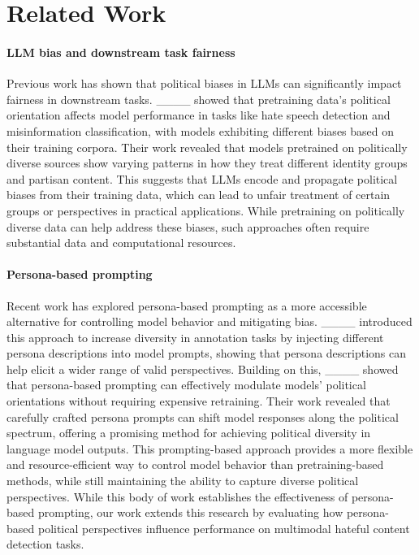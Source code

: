 \section{Related Work}
\paragraph{\textbf{LLM bias and downstream task fairness}}
Previous work has shown that political biases in LLMs can significantly impact fairness in downstream tasks. ____ showed that pretraining data's political orientation affects model performance in tasks like hate speech detection and misinformation classification, with models exhibiting different biases based on their training corpora. Their work revealed that models pretrained on politically diverse sources show varying patterns in how they treat different identity groups and partisan content. This suggests that LLMs encode and propagate political biases from their training data, which can lead to unfair treatment of certain groups or perspectives in practical applications. 
While pretraining on politically diverse data can help address these biases, such approaches often require substantial data and computational resources.


\paragraph{\textbf{Persona-based prompting}}
Recent work has explored persona-based prompting as a more accessible alternative for controlling model behavior and mitigating bias. ____ introduced this approach to increase diversity in annotation tasks by injecting different persona descriptions into model prompts, showing that persona descriptions can help elicit a wider range of valid perspectives. Building on this, ____ showed that persona-based prompting can effectively modulate models' political orientations without requiring expensive retraining. Their work revealed that carefully crafted persona prompts can shift model responses along the political spectrum, offering a promising method for achieving political diversity in language model outputs. This prompting-based approach provides a more flexible and resource-efficient way to control model behavior than pretraining-based methods, while still maintaining the ability to capture diverse political perspectives. While this body of work establishes the effectiveness of persona-based prompting, our work extends this research by evaluating how persona-based political perspectives influence performance on multimodal hateful content detection tasks.